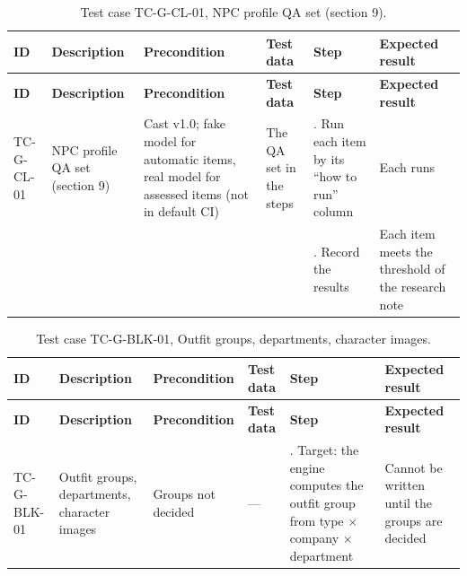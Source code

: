 {\footnotesize{}\renewcommand{\arraystretch}{1.1}
\begin{longtable}{|>{\raggedright\arraybackslash}p{}|>{\raggedright\arraybackslash}p{}|>{\raggedright\arraybackslash}p{}|>{\raggedright\arraybackslash}p{}|>{\raggedright\arraybackslash}p{}|>{\raggedright\arraybackslash}p{}|}
\caption{Test case TC-G-CL-01, NPC profile QA set (section 9).} \\
\hline
\textbf{ID} & \textbf{Description} & \textbf{Precondition} & \textbf{Test data} & \textbf{Step} & \textbf{Expected result} \\ \hline
\endfirsthead
\hline
\textbf{ID} & \textbf{Description} & \textbf{Precondition} & \textbf{Test data} & \textbf{Step} & \textbf{Expected result} \\ \hline
\endhead
TC-G-CL-01 & NPC profile QA set (section 9) & Cast v1.0; fake model for automatic items, real model for assessed items (not in default CI) & The QA set in the steps & 1. Run each item by its ``how to run'' column & Each runs \\ \cline{5-6}
 &  &  &  & 2. Record the results & Each item meets the threshold of the research note \\ \hline
\end{longtable}
}

{\footnotesize{}\renewcommand{\arraystretch}{1.1}
\begin{longtable}{|>{\raggedright\arraybackslash}p{}|>{\raggedright\arraybackslash}p{}|>{\raggedright\arraybackslash}p{}|>{\raggedright\arraybackslash}p{}|>{\raggedright\arraybackslash}p{}|>{\raggedright\arraybackslash}p{}|}
\caption{Test case TC-\allowbreak{}G-\allowbreak{}BLK-\allowbreak{}01, Outfit groups, departments, character images.} \\
\hline
\textbf{ID} & \textbf{Description} & \textbf{Precondition} & \textbf{Test data} & \textbf{Step} & \textbf{Expected result} \\ \hline
\endfirsthead
\hline
\textbf{ID} & \textbf{Description} & \textbf{Precondition} & \textbf{Test data} & \textbf{Step} & \textbf{Expected result} \\ \hline
\endhead
TC-G-BLK-01 & Outfit groups, departments, character images & Groups not decided & --- & 1. Target: the engine computes the outfit group from type $\times$ company $\times$ department & Cannot be written until the groups are decided \\ \hline
\end{longtable}
}

